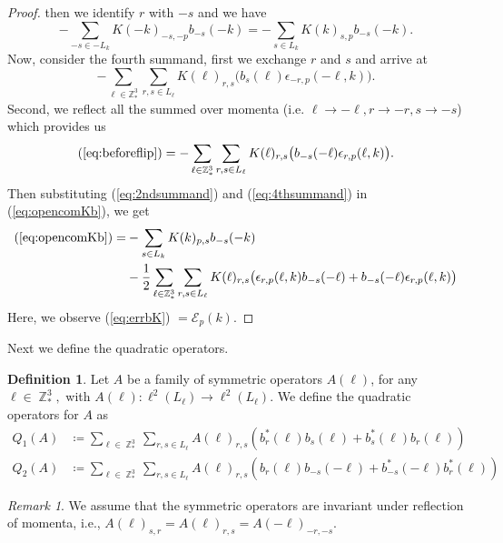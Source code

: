 \documentclass[sn-mathphys, Numbered ,a4paper]{sn-jnl}%
\DeclareMathOperator{\Z}{\mathbb{Z}}
\newcommand{\half}{\frac{1}{2}}
\theoremstyle{plain}
\theoremstyle{definition}
\newtheorem{definition}[theorem]{Definition}
\theoremstyle{remark}
\newtheorem{remark}[theorem]{Remark}
\theoremstyle{plain}
\theoremstyle{definition}
\theoremstyle{remark}
\begin{document}
\begin{proof}
   then we identify $r$ with $-s$ and we have
   \begin{equation}\label{eq:2ndsummand}
        - \sum\limits_{-s\in -L_{k}}K(-k)_{-s,-p}b_{-s}(-k) =- \sum\limits_{s\in L_{k}}K(k)_{s,p}b_{-s}(-k) .
   \end{equation}
   Now, consider the fourth summand, first we exchange $r$ and $s$ and arrive at
   \begin{equation}\label{eq:beforeflip}
       - \sum\limits_{\ell\in \mathbb{Z}^3_*}\sum\limits_{r,s\in L_\ell}K(\ell)_{r,s}\big(b_{s}(\ell)\epsilon_{-r,p}(-\ell,k)\big).
   \end{equation}
   Second, we reflect all the summed over momenta (i.e. $\ell\rightarrow-\ell, r\rightarrow-r, s\rightarrow-s$) which provides us
   \begin{equation}\label{eq:4thsummand}
       (\ref{eq:beforeflip}) = - \sum\limits_{\ell\in \mathbb{Z}^3_*}\sum\limits_{r,s\in L_\ell}K(\ell)_{r,s}\big(b_{-s}(-\ell)\epsilon_{r,p}(\ell,k)\big).
   \end{equation}
   Then substituting (\ref{eq:2ndsummand}) and (\ref{eq:4thsummand}) in (\ref{eq:opencomKb}), we get
   \begin{align}
       (\ref{eq:opencomKb})=&-\sum\limits_{s\in L_k}K(k)_{p,s}b_{-s}(-k) \\
      &- \half\sum\limits_{\ell\in \mathbb{Z}^3_*}\sum\limits_{r,s\in L_\ell}K(\ell)_{r,s}\big(\epsilon_{r,p}(\ell,k)b_{-s}(-\ell)+b_{-s}(-\ell)\epsilon_{r,p}(\ell,k)\big)\label{eq:errbK}
   \end{align}
   Here, we observe (\ref{eq:errbK}) $=  \mathcal{E}_{p}(k) $.
\end{proof}
Next we define the quadratic operators.\newline
\begin{definition}
Let $A$ be a family of symmetric operators $A(\ell)$, for any $ \ell \in \Z^3_*,$ with $A(\ell): \ell^2(L_\ell)\rightarrow\ell^2(L_\ell)$. We define the quadratic operators for $A$ as
\begin{align} 
    Q_1(A)&\coloneq  \sum\limits_{\ell \in \Z^3_*}\sum\limits_{r,s \in L_{\ell}}A(\ell)_{r,s} \left(b^*_r(\ell)b_{s}(\ell)+b^*_{s}(\ell)b_{r}(\ell)\right)\label{eq:Q1}\\ 
    Q_2(A)&\coloneq  \sum\limits_{\ell \in \Z^3_*}\sum\limits_{r,s \in L_{\ell}}A(\ell)_{r,s} \left(b_r(\ell)b_{-s}(-\ell)+b^*_{-s}(-\ell)b^*_{r}(\ell)\right)\label{eq:Q2}
\end{align}
\begin{remark}
 We assume that the symmetric operators are invariant under reflection of momenta, i.e., $A(\ell)_{s,r} = A(\ell)_{r,s} = A(-\ell)_{-r,-s}.$\newline
\end{remark}

\end{definition}
\end{document}
